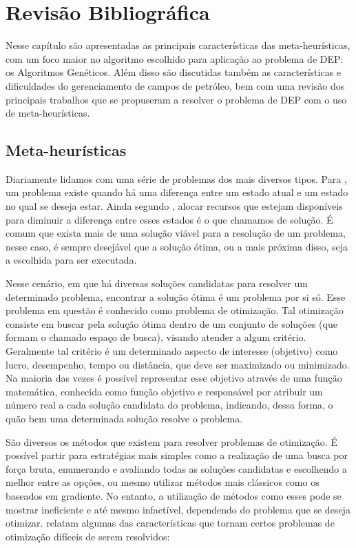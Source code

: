 \chapter{Revisão Bibliográfica}
\label{ch:chapter2}
Nesse capítulo são apresentadas as principais características das meta-heurísticas, com um foco maior no algoritmo escolhido para aplicação ao problema de DEP: os Algoritmos Genéticos. Além disso são discutidas também as características e dificuldades do gerenciamento de campos de petróleo, bem com uma revisão dos principais trabalhos que se propuseram a resolver o problema de DEP com o uso de meta-heurísticas.

\section{Meta-heurísticas}
\label{sec:section21}
Diariamente lidamos com uma série de problemas dos mais diversos tipos. Para \cite{Michalewicz2004}, um problema existe quando há uma diferença entre um estado atual e um estado no qual se deseja estar. Ainda segundo \cite{Michalewicz2004}, alocar recursos que estejam disponíveis para diminuir a diferença entre esses estados é o que chamamos de solução. É comum que exista mais de uma solução viável para a resolução de um problema, nesse caso, é sempre desejável que a solução ótima, ou a mais próxima disso, seja a escolhida para ser executada.

Nesse cenário, em que há diversas soluções candidatas para resolver um determinado problema, encontrar a solução ótima é um problema por si só. Esse problema em questão é conhecido como problema de otimização.  Tal otimização consiste em buscar pela solução ótima dentro de um conjunto de soluções (que formam o chamado espaço de busca), visando atender a algum critério. Geralmente tal critério é um determinado aspecto de interesse (objetivo) como lucro, desempenho, tempo ou distância, que deve ser maximizado ou minimizado. Na maioria das vezes é possível representar esse objetivo através de uma função matemática, conhecida como função objetivo e responsável por atribuir um número real a cada solução candidata do problema, indicando, dessa forma, o quão bem uma determinada solução resolve o problema.

São diversos os métodos que existem para resolver problemas de otimização. É possível partir para estratégias mais simples como a realização de uma busca por força bruta, enumerando e avaliando todas as soluções candidatas e escolhendo a melhor entre as opções, ou mesmo utilizar métodos mais clássicos como os baseados em gradiente. No entanto, a utilização de métodos como esses pode se mostrar ineficiente e até mesmo infactível, dependendo do problema que se deseja otimizar. \cite{Michalewicz2004} relatam algumas das características que tornam certos problemas de otimização difíceis de serem resolvidos:

